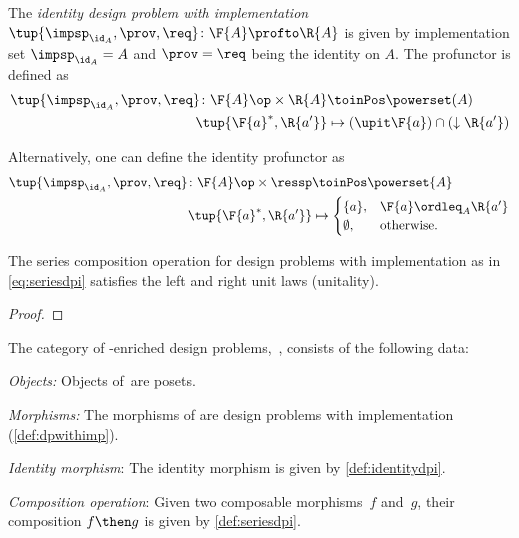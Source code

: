\begin{definition}
    \label{def:identitydpi}
    The \emph{identity design problem with implementation}~$\tup{\impsp_{\id_A},\prov,\req} \colon \F{A} \profto \R{A}$ is given by implementation set $\impsp_{\id_A} = A$ and $\prov=\req$ being
    the identity on $A$.
    The profunctor is defined as
    \begin{align}
        \tup{\impsp_{\id_A},\prov,\req} \colon \F{A}\op \times \R{A} & \toinPos \powerset(A)                          \\
        \tup{\F{a}^*,\R{a'}}                                         & \mapsto (\upit \F{a}) \cap (\downarrow \R{a'})
    \end{align}
\end{definition}
\begin{remark}
    Alternatively, one can define the identity profunctor as
    \begin{align}
        \tup{\impsp_{\id_A},\prov,\req}\colon \F{A}\op \times \ressp & \toinPos \powerset{A} \\
        \tup{\F{a}^*,\R{a'}}                                         & \mapsto
        \begin{cases}
            \{a\},     & \F{a}\ordleq_A \R{a'} \\
            \emptyset, & \text{otherwise}.
        \end{cases}
    \end{align}
\end{remark}

\begin{lemma}
    The series composition operation for design problems with implementation as in \cref{eq:seriesdpi} satisfies the left and right unit laws (unitality).
\end{lemma}

\begin{proof}
\end{proof}

\begin{definition}
    The category of \Set-enriched design problems,~\DPI, consists of the following data:
    \begin{compactenum}
        \item \emph{Objects:}  Objects of~\DPI are posets.
        \item \emph{Morphisms:} The morphisms of \DPI are design problems with implementation (\cref{def:dpwithimp}).
        \item \emph{Identity morphism}: The identity morphism is given by \cref{def:identitydpi}.
        \item \emph{Composition operation}: Given two composable morphisms~$f$ and~$g$, their composition $f\then g$ is given by \cref{def:seriesdpi}.
    \end{compactenum}
\end{definition}

